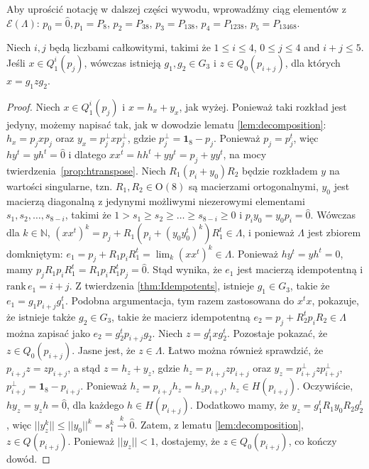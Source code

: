 {Aby uprościć notację w dalszej części wywodu,
wprowadźmy ciąg elementów z $\mathcal{E}(\Lambda)$:
$p_{0} = \hat{0}, p_{1} = P_{8}$, $p_{2} = P_{38}$,
$p_{3} = P_{138}$, $p_{4} = P_{1238}$, $p_{5} = P_{13468}$.
\begin{Theorem}
\label{thm:LowerIndices}
    Niech $i,j$ będą liczbami całkowitymi, takimi że
    $1 \leq i \leq 4$, $0 \leq j \leq 4$ and $i+j \leq 5$.
Jeśli $x \in Q_{1}^{i}(p_{j})$,
wówczas istnieją $g_{1}, g_{2} \in G_{3}$ i $z \in Q_{0}(p_{i+j})$,
dla których $x = g_{1} z g_{2}$.
\end{Theorem}
\begin{proof}
    Niech $x \in Q_{1}^{i}(p_{j})$ i
    $x = h_{x} + y_{x}$, jak wyżej.
    Ponieważ taki rozkład jest jedyny, możemy napisać tak, jak w dowodzie
    lematu \ref{lem:decomposition}:
    $h_{x} = p_{j} x p_{j}$ oraz $y_{x} = p_{j}^{\perp} x p_{j}^{\perp}$,
    gdzie $p_{j}^{\perp} = \mathbf{1}_{8} - p_{j}$.
    Ponieważ $p_{j} = p_{j}^{t}$, więc
    $h y^{t} = y h^{t} = \hat{0}$ i dlatego
    $x x^{t}  = h h^{t} + y y^{t} = p_{j} + y y^{t}$,
    na mocy \mbox{twierdzenia \ref{prop:htranspose}}.
    Niech $R_{1} (p_{i} + y_{0}) R_{2}$ będzie rozkładem $y$ na wartości
    singularne, tzn. $R_{1}, R_{2} \in \text{O}(8)$ są macierzami ortogonalnymi,
    $y_{0}$ jest macierzą diagonalną z jedynymi możliwymi niezerowymi elementami
    $s_{1}, s_{2}, \ldots, s_{8-i}$, takimi że
    $1 > s_{1} \geq s_{2} \geq \ldots \geq s_{8-i} \geq 0$
    i $p_{i} y_{0} = y_{0} p_{i} = \hat{0}$.
    Wówczas dla $k \in \mathbb{N}$,
    $(x x^{t})^{k} = p_{j} + R_{1}( p_{i} + (y_{0} y_{0}^{t})^{k}) R_{1}^{t} \in \Lambda$,
    i ponieważ $\Lambda$ jest zbiorem domkniętym:
    $e_{1} = p_{j} + R_{1} p_{i} R_{1}^{t} = \lim_{k} (x x^{t})^{k} \in \Lambda$.
    Ponieważ $h y^{t} = y h^{t} = \hat{0}$,
    mamy $p_{j} R_{1} p_{i} R_{1}^{t} = R_{1} p_{i} R_{1}^{t} p_{j} = \hat{0}$.
    Stąd wynika, że $e_{1}$ jest macierzą idempotentną i
    $\text{rank} \, e_{1} = i+j$.
    Z twierdzenia \ref{thm:Idempotents}, istnieje $g_{1} \in G_{3}$, takie że
    $e_{1} = g_{1} p_{i+j} g_{1}^{t}$.
    Podobna argumentacja,
    tym razem zastosowana do $x^{t} x$, pokazuje,
    że istnieje także $g_{2} \in G_{3}$,
    takie że macierz idempotentną
    $e_{2} = p_{j} + R_{2}^{t} p_{i} R_{2} \in \Lambda$
    można zapisać jako $e_{2} = g_{2}^{t} p_{i+j} g_{2}$.
    Niech $z = g_{1}^{t} x g_{2}^{t}$.
    Pozostaje pokazać, że $z \in Q_{0}(p_{i+j})$.
    Jasne jest, że $z \in \Lambda$.
    Łatwo można również sprawdzić, że $p_{i+j} z = z p_{i+j}$,
    a stąd $z = h_{z} + y_{z}$, gdzie $h_{z} = p_{i+j} z p_{i+j}$
    oraz $y_{z} = p_{i+j}^{\perp} z p_{i+j}^{\perp}$,
    $p_{i+j}^{\perp} = \mathbf{1}_{8} - p_{i+j}$.
    Ponieważ $h_{z} = p_{i+j} h_{z} = h_{z} p_{i+j}$,
    $h_{z} \in H(p_{i+j})$.
    Oczywiście, $h y_{z} = y_{z} h = \hat{0}$, dla każdego $h \in H(p_{i+j})$.
    Dodatkowo mamy, że
    $y_{z} = g_{1}^{t}R_{1} y_{0} R_{2} g_{2}^{t}$, więc
    $||y_{z}^{k}|| \leq ||y_{0}||^{k} = s_{1}^{k} \overset{k}{\rightarrow} \hat{0}$.
    Zatem, z lematu \ref{lem:decomposition}, $z \in Q(p_{i+j})$.
    Ponieważ $||y_{z}|| < 1$, dostajemy, że
    $z \in Q_{0}(p_{i+j})$, co kończy dowód.
\end{proof}

}
